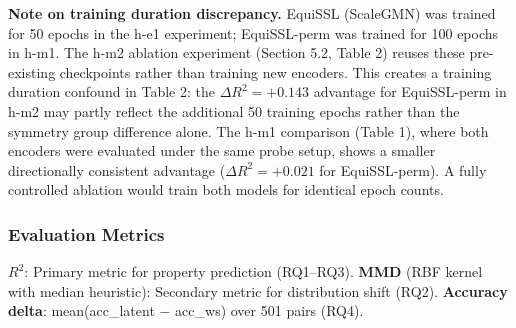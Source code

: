\textbf{Note on training duration discrepancy.} EquiSSL (ScaleGMN) was trained for 50 epochs in the h-e1 experiment; EquiSSL-perm was trained for 100 epochs in h-m1. The h-m2 ablation experiment (Section 5.2, Table 2) reuses these pre-existing checkpoints rather than training new encoders. This creates a training duration confound in Table 2: the $\Delta R^{2}=+0.143$ advantage for EquiSSL-perm in h-m2 may partly reflect the additional 50 training epochs rather than the symmetry group difference alone. The h-m1 comparison (Table 1), where both encoders were evaluated under the same probe setup, shows a smaller directionally consistent advantage ($\Delta R^{2}=+0.021$ for EquiSSL-perm). A fully controlled ablation would train both models for identical epoch counts.

\subsubsection{Evaluation Metrics}

\textbf{$R^2$}: Primary metric for property prediction (RQ1--RQ3). \textbf{MMD} (RBF kernel with median heuristic): Secondary metric for distribution shift (RQ2). \textbf{Accuracy delta}: mean(acc\_latent $-$ acc\_ws) over 501 pairs (RQ4).

